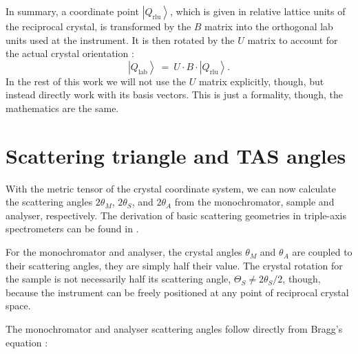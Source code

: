 In summary, a coordinate point $\left|Q_{\mathrm{rlu}}\right>$, which is given in relative lattice 
units of the reciprocal crystal, 
is transformed by the $B$ matrix into the orthogonal lab units used at the instrument. 
It is then rotated by the $U$ matrix to account for the actual crystal orientation \cite{Lumsden2005}:
\begin{equation}
	\left|Q_{\mathrm{lab}}\right> \ =\  U \cdot B \cdot \left|Q_{\mathrm{rlu}}\right>.
\end{equation}
In the rest of this work we will not use the $U$ matrix explicitly, though, but instead directly work 
with its basis vectors. This is just a formality, though, the mathematics are the same.





\section{Scattering triangle and TAS angles \label{sec:tasangles}}

With the metric tensor \cite[pp. 807-809]{Arens2015} of the crystal coordinate system, we can now calculate the scattering angles
$2 \theta_M$, $2 \theta_S$, and $2 \theta_A$ from the monochromator, sample and analyser, respectively. 
The derivation of basic scattering geometries in triple-axis spectrometers can be found in \cite[Ch. 1.3]{Shirane2002}.

For the monochromator and analyser, the crystal angles $\theta_M$ and $\theta_A$ are coupled to 
their scattering angles, they are simply half their value. 
The crystal rotation for the sample is not necessarily half its scattering angle, $\Theta_S \ne 2\theta_S/2$, 
though, because the instrument can be freely positioned at any point of reciprocal crystal space.

The monochromator and analyser scattering angles follow directly from Bragg's equation 
\cite[p. 68]{Gross2012} \cite[p. 13]{Shirane2002}:

